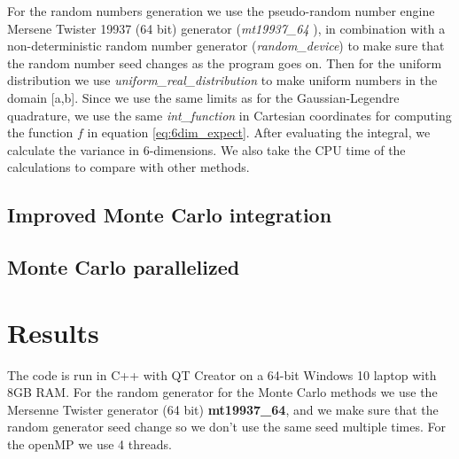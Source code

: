\documentclass[12pt,a4paper,english]{article}
\begin{document}
For the random numbers generation we use the pseudo-random number engine Mersene Twister 19937 (64 bit) generator (\textit{mt19937\_64
}), in combination with a non-deterministic random number generator (\textit{random\_device}) to make sure that the random number seed changes as the program goes on. Then for the uniform distribution we use \textit{uniform\_real\_distribution} to make uniform numbers in the domain [a,b]. Since we use the same limits as for the Gaussian-Legendre quadrature, we use the same \textit{int\_function} in Cartesian coordinates for computing the function $f$ in equation \ref{eq:6dim_expect}. After evaluating the integral, we calculate the variance in 6-dimensions. We also take the CPU time of the calculations to compare with other methods.

\subsection{Improved Monte Carlo integration}
\subsection{Monte Carlo parallelized}


\section{Results}
The code is run in C++ with QT Creator on a 64-bit Windows 10 laptop with 8GB RAM. For the random generator for the Monte Carlo methods we use the Mersenne Twister generator (64 bit) \textbf{mt19937\_64}, and we make sure that the random generator seed change so we don't use the same seed multiple times. For the openMP we use 4 threads.
\end{document}
